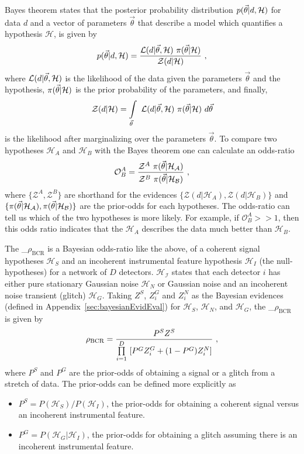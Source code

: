 \documentclass[%
 nofootinbib,
 amsmath,amssymb,
 aps,
 twocolumn,
 superscriptaddress
]{revtex4-2}
\newcommand{\mathcmd}[1]{{\sc \relax\ifmmode#1\else $#1$\fi}\xspace}
\newcommand{\bcr}{\mathcmd{\rho_\text{BCR}}}
\newcommand{\parameters}{\mathcmd{\vec{\theta}}}
\begin{document}
Bayes theorem states that the posterior probability distribution $p(\parameters|d,\mathcal{H})$ for data $d$ and a vector of parameters \parameters that describe a model which quantifies a hypothesis $\mathcal{H}$, is given by
\begin{equation}
p(\parameters|d,\mathcal{H}) = \frac{\mathcal{L}(d|\parameters, \mathcal{H}) \ \pi(\parameters | \mathcal{H})}{\mathcal{Z}(d|\mathcal{H})}\ , 
\end{equation}
where $\mathcal{L}(d|\parameters, \mathcal{H})$ is the likelihood of the data given the parameters \parameters and the hypothesis, $\pi(\parameters | \mathcal{H})$ is the prior probability of the parameters, and finally,
\begin{equation}
    \mathcal{Z}(d|\mathcal{H}) = \int\limits_{\parameters} \ \mathcal{L}(d|\parameters,\mathcal{H}) \ \pi(\parameters | \mathcal{H}) \ d\parameters
\end{equation} is the likelihood after marginalizing over the parameters \parameters.  To compare two hypotheses $\mathcal{H}_A$ and $\mathcal{H}_B$ with the Bayes theorem one can calculate an odds-ratio
\begin{equation}
    \mathcal{O}^A_B = \frac{\mathcal{Z}^A\ \pi(\parameters | \mathcal{H_A})}{\mathcal{Z}^B\ \pi(\parameters | \mathcal{H_B})}\ ,
\end{equation}
where $\{\mathcal{Z}^A, \mathcal{Z}^B\}$ are shorthand for the evidences $\{\mathcal{Z}(d|\mathcal{H}_A), \mathcal{Z}(d|\mathcal{H}_B)\}$ and $\{\pi(\parameters | \mathcal{H_A}), \pi(\parameters | \mathcal{H_B})\}$ are the prior-odds for each hypotheses. The odds-ratio can tell us which of the two hypotheses is more likely. For example, if $\mathcal{O}^A_B >> 1$, then this odds ratio indicates that the $\mathcal{H}_A$ describes the data much better than $\mathcal{H}_B$. 

The \bcr is a Bayesian odds-ratio like the above, of a coherent signal hypotheses $\mathcal{H}_S$ and an incoherent instrumental feature hypothesis $\mathcal{H}_I$ (the null-hypotheses) for a network of $D$ detectors. $\mathcal{H_I}$ states that each detector $i$ has either pure stationary Gaussian noise $\mathcal{H}_N$ or Gaussian noise and an incoherent noise transient (glitch) $\mathcal{H}_G$. Taking $Z^S$, $Z^G_i$ and $Z^N_i$ as the Bayesian evidences (defined in Appendix~\ref{sec:bayesianEvidEval}) for $\mathcal{H}_S$, $\mathcal{H}_N$, and $\mathcal{H}_G$, the \bcr is given by
\begin{equation}
\label{eq:bcr}
\bcr = \frac{P^S Z^S}{\prod\limits^D_{i=1} \ [P^G Z^G_i + (1-P^G)Z^N_i]}\ ,
\end{equation}
where $P^S$ and $P^G$ are the prior-odds of obtaining a signal or a glitch from a stretch of data. The prior-odds can be defined more explicitly as 
\begin{itemize}
    \item $P^S=P(\mathcal{H}_S)/P(\mathcal{H}_I)$, the prior-odds for obtaining a coherent signal versus an incoherent instrumental feature.
    \item $P^G=P(\mathcal{H}_G| \mathcal{H}_I)$, the prior-odds for obtaining a glitch assuming there is an incoherent instrumental feature.
\end{itemize}
\end{document}
